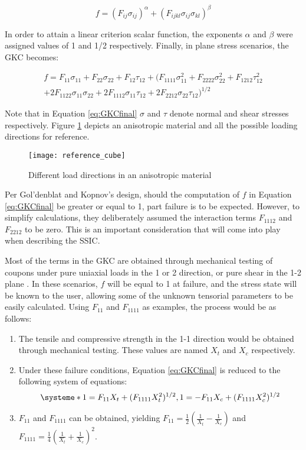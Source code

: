 \documentclass[main.tex]{subfiles}
\begin{document}
\begin{equation} \label{eq:GKCgenTrunc}
f=(F_{ij}\sigma_{ij})^\alpha + (F_{ijkl}\sigma_{ij}\sigma_{kl})^\beta
\end{equation}

In order to attain a linear criterion scalar function, the exponents $\alpha$ and $\beta$ were assigned values of 1 and 1/2 respectively. Finally, in plane stress scenarios, the GKC becomes:

\begin{equation} \label{eq:GKCfinal}
\begin{split}
f=F_{11}\sigma_{11} + F_{22}\sigma_{22} + F_{12}\tau_{12} + (F_{1111}\sigma_{11}^{2} + F_{2222}\sigma_{22}^{2} + F_{1212}\tau_{12}^{2} \\ + 2F_{1122}\sigma_{11}\sigma_{22} + 2F_{1112}\sigma_{11}\tau_{12} + 2F_{2212}\sigma_{22}\tau_{12})^{1/2}
\end{split}
\end{equation}

Note that in Equation \ref{eq:GKCfinal} $\sigma$ and $\tau$ denote normal and shear stresses respectively. Figure \ref{fig:loaddir} depicts an anisotropic material and all the possible loading directions for reference.

\begin{figure}[h]
	\center
	\texttt{[image: reference\_cube]}
	\caption{Different load directions in an anisotropic material} \label{fig:loaddir}
\end{figure}

Per Gol'denblat and Kopnov's design, should the computation of $f$ in Equation \ref{eq:GKCfinal} be greater or equal to 1, part failure is to be expected. However, to simplify calculations, they deliberately assumed the interaction terms $F_{1112}$ and $F_{2212}$ to be zero. This is an important consideration that will come into play when describing the SSIC.

Most of the terms in the GKC are obtained through mechanical testing of coupons under pure uniaxial loads in the 1 or 2 direction, or pure shear in the 1-2 plane \cite{Osswald2017a}. In these scenarios, $f$ will be equal to 1 at failure, and the stress state will be known to the user, allowing some of the unknown tensorial parameters to be easily calculated. Using $F_{11}$ and $F_{1111}$ as examples, the process would be as follows:


\begin{enumerate}
	\item The tensile and compressive strength in the 1-1 direction would be obtained through mechanical testing. These values are named $X_t$ and $X_c$ respectively.
	\item Under these failure conditions, Equation \ref{eq:GKCfinal} is reduced to the following system of equations:
	\[
	\systeme*{1=F_{11}X_t + (F_{1111}X_t^{2})^{1/2}, 1= -F_{11}X_c + (F_{1111}X_c^{2})^{1/2}}
	\]
	
	\item $F_{11}$ and $F_{1111}$ can be obtained, yielding $F_{11}=\frac{1}{2}(\frac{1}{X_t}-\frac{1}{X_c})$ and $F_{1111}=\frac{1}{4}(\frac{1}{X_t}+\frac{1}{X_c})^2$.
\end{enumerate}
\end{document}
